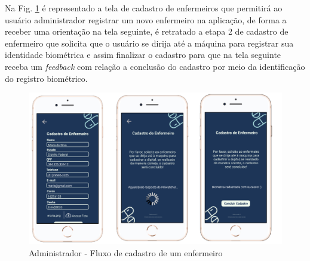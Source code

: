 Na Fig. \ref{fig:prototipo_admin_cadastroEnfermeiro_Parte1} é representado a tela de cadastro de enfermeiros que permitirá ao usuário administrador registrar um novo enfermeiro na aplicação, de forma a receber uma orientação na tela seguinte, é retratado a etapa 2 de cadastro de enfermeiro que solicita que o usuário se dirija até a máquina para registrar sua identidade biométrica e assim finalizar o cadastro para que na tela seguinte receba um \textit{feedback} com relação a conclusão do cadastro por meio da identificação do registro biométrico.
\begin{figure}[H]
    \centering
    \includegraphics[width=15cm]{figuras/software/Atual_prototipo/Admin_CadastroEnfermeiro.png}
    \caption{Administrador - Fluxo de cadastro de um enfermeiro}
    \label{fig:prototipo_admin_cadastroEnfermeiro_Parte1}
\end{figure}

